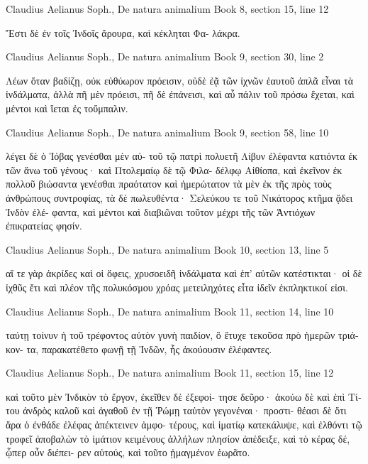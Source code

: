 \documentclass[12pt,letterpaper,twoside,final]{memoir}
\begin{document}
\begin{greek}
Claudius Aelianus Soph., De natura animalium 
Book 8, section 15, line 12

Ἔστι δὲ ἐν τοῖς Ἰνδοῖς ἄρουρα, καὶ κέκληται Φα-
λάκρα. 



Claudius Aelianus Soph., De natura animalium 
Book 9, section 30, line 2

Λέων ὅταν βαδίζῃ, οὐκ εὐθύωρον πρόεισιν, οὐδὲ 
ἐᾷ τῶν ἰχνῶν ἑαυτοῦ ἁπλᾶ εἶναι τὰ ἰνδάλματα, ἀλλὰ 
πῆ μὲν πρόεισι, πῆ δὲ ἐπάνεισι, καὶ αὖ πάλιν τοῦ 
πρόσω ἔχεται, καὶ μέντοι καὶ ἵεται ἐς τοὔμπαλιν. 



Claudius Aelianus Soph., De natura animalium 
Book 9, section 58, line 10

                    λέγει δὲ ὁ Ἰόβας γενέσθαι μὲν αὐ-
τοῦ τῷ πατρὶ πολυετῆ Λίβυν ἐλέφαντα κατιόντα ἐκ 
τῶν ἄνω τοῦ γένους· καὶ Πτολεμαίῳ δὲ τῷ Φιλα-
δέλφῳ Αἰθίοπα, καὶ ἐκεῖνον ἐκ πολλοῦ βιώσαντα 
γενέσθαι πραότατον καὶ ἡμερώτατον τὰ μὲν ἐκ τῆς 
πρὸς τοὺς ἀνθρώπους συντροφίας, τὰ δὲ πωλευθέντα· 
Σελεύκου τε τοῦ Νικάτορος κτῆμα ᾄδει Ἰνδὸν ἐλέ-
φαντα, καὶ μέντοι καὶ διαβιῶναι τοῦτον μέχρι τῆς 
τῶν Ἀντιόχων ἐπικρατείας φησίν. 



Claudius Aelianus Soph., De natura animalium 
Book 10, section 13, line 5

             αἵ τε γὰρ ἀκρίδες καὶ οἱ ὄφεις, χρυσοειδῆ 
ἰνδάλματα καὶ ἐπ' αὐτῶν κατέστικται· οἱ δὲ ἰχθῦς ἔτι 
καὶ πλέον τῆς πολυκόσμου χρόας μετειληχότες εἶτα 
ἰδεῖν ἐκπληκτικοί εἰσι. 



Claudius Aelianus Soph., De natura animalium 
Book 11, section 14, line 10

                  ταύτῃ τοίνυν ἡ τοῦ τρέφοντος αὐτὸν 
γυνὴ παιδίον, ὃ ἔτυχε τεκοῦσα πρὸ ἡμερῶν τριάκον-
τα, παρακατέθετο φωνῇ τῇ Ἰνδῶν, ἧς ἀκούουσιν 
ἐλέφαντες. 



Claudius Aelianus Soph., De natura animalium 
Book 11, section 15, line 12

καὶ τοῦτο μὲν Ἰνδικὸν τὸ ἔργον, ἐκεῖθεν δὲ ἐξεφοί-
τησε δεῦρο· ἀκούω δὲ καὶ ἐπὶ Τίτου ἀνδρὸς καλοῦ 
καὶ ἀγαθοῦ ἐν τῇ Ῥώμῃ ταὐτὸν γεγονέναι· προστι-
θέασι δὲ ὅτι ἄρα ὁ ἐνθάδε ἐλέφας ἀπέκτεινεν ἀμφο-
τέρους, καὶ ἱματίῳ κατεκάλυψε, καὶ ἐλθόντι τῷ 
τροφεῖ ἀποβαλὼν τὸ ἱμάτιον κειμένους ἀλλήλων 
πλησίον ἀπέδειξε, καὶ τὸ κέρας δέ, ᾧπερ οὖν διέπει-
ρεν αὐτούς, καὶ τοῦτο ᾑμαγμένον ἑωρᾶτο. 




\end{greek}
\end{document}
